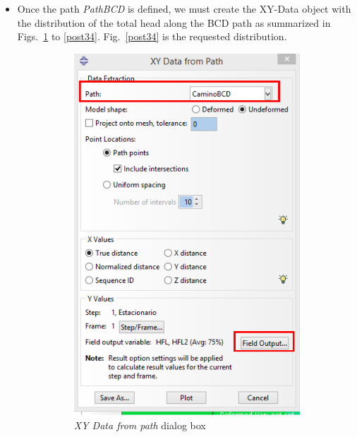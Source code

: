 \begin{itemize}
\item Once the path \textit{PathBCD} is defined, we must create the
  XY-Data object with the distribution of the total head along the BCD
  path as summarized in Figs.~\ref{post31} to
  \ref{post34}. Fig.~\ref{post34} is the requested distribution.
  \begin{figure}[!h]
    \centering
    \begin{subfigure}[!h]{0.33\textwidth}
      \includegraphics[width=\textwidth]{./body/images/post31.pdf}
      \caption{\textit{XY Data from path} dialog box}
      \label{post31}
    \end{subfigure}%
    \begin{subfigure}[!h]{0.33\textwidth}

\end{subfigure}
\end{figure}
\end{itemize}
